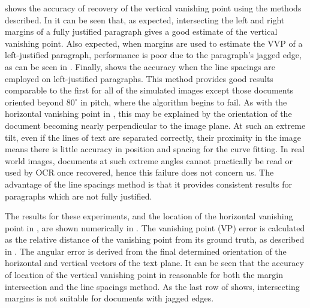 { shows the accuracy of recovery of the vertical vanishing point using the methods described.
In  it can be seen that,
as expected, intersecting the left and right margins of a fully justified paragraph gives a good estimate of the vertical vanishing point.
Also expected, when margins are used to estimate the VVP of a left-justified
paragraph, performance is poor due to the paragraph's jagged edge, as can be
seen in .
Finally,  shows the accuracy when the line spacings are employed on left-justified paragraphs.
This method provides good results comparable to the first for all of the simulated images except those documents oriented beyond $80^\circ$ in pitch, where the algorithm begins to fail.
As with the horizontal vanishing point in , this may be explained by the orientation of the document becoming nearly perpendicular to the image plane.
At such an extreme tilt, even if the lines of text are separated correctly, their proximity in the image means there is little accuracy in position and spacing for the curve fitting.
In real world images, documents at such extreme angles cannot practically be read or used by OCR once recovered, hence this failure does not concern us.
The advantage of the line spacings method is that it provides consistent results for paragraphs which are not fully justified.

The results for these experiments, and the location of the horizontal vanishing point in , are shown numerically in .
The vanishing point (VP) error is calculated as the relative distance of the vanishing point from its ground truth, as described in .
The angular error is derived from the final determined orientation of the horizontal and vertical vectors of the text plane.
It can be seen that the accuracy of location of the vertical vanishing point in reasonable for both the margin intersection and the line spacings method.
As the last row of  shows, intersecting margins is not suitable for documents with jagged edges.

}



